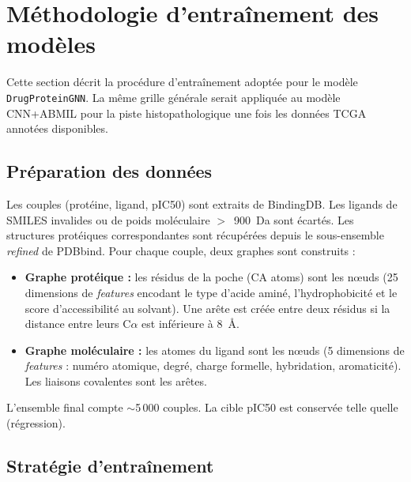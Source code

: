 \documentclass[12pt,a4paper,oneside]{book}
\begin{document}
\section{Méthodologie d'entraînement des modèles}
\label{sec:train_methodo}

Cette section décrit la procédure d'entraînement adoptée pour le modèle
\texttt{DrugProteinGNN}. La même grille générale serait appliquée au modèle
CNN+ABMIL pour la piste histopathologique une fois les données TCGA
annotées disponibles.

\subsection{Préparation des données}

Les couples (protéine, ligand, pIC50) sont extraits de BindingDB. Les
ligands de SMILES invalides ou de poids moléculaire $>$~900~Da sont écartés.
Les structures protéiques correspondantes sont récupérées depuis le
sous-ensemble \emph{refined} de PDBbind. Pour chaque couple, deux graphes
sont construits :

\begin{itemize}
  \item \textbf{Graphe protéique :} les résidus de la poche (CA atoms) sont
    les nœuds (25 dimensions de \textit{features} encodant le type d'acide
    aminé, l'hydrophobicité et le score d'accessibilité au solvant). Une
    arête est créée entre deux résidus si la distance entre leurs C$\alpha$
    est inférieure à 8~Å.
  \item \textbf{Graphe moléculaire :} les atomes du ligand sont les nœuds
    (5 dimensions de \textit{features} : numéro atomique, degré, charge
    formelle, hybridation, aromaticité). Les liaisons covalentes sont les
    arêtes.
\end{itemize}

L'ensemble final compte $\sim$5\,000 couples. La cible pIC50 est conservée
telle quelle (régression).

\subsection{Stratégie d'entraînement}
\end{document}
